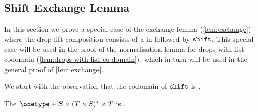 \subsection{Shift Exchange Lemma}\label{sec:appendix:shift-exchange}

In this section we prove a special case of the exchange lemma (\cref{lem:exchange}) where the drop-lift composition consists of a  in  followed by $\mathtt{shift}$. This special case will be used in the proof of the normalisation lemma for drops with list codomain (\cref{lem:drops-with-list-co-domain}), which in turn will be used in the general proof of \cref{lem:exchange}. 

We start with the observation that the codomain of $\mathtt{shift}$ is .

\begin{lemma}\label{lem:shift-type-is-injective}
    The  $\onetype + S \times (T \times S)^* \times T$ is .
\end{lemma}

